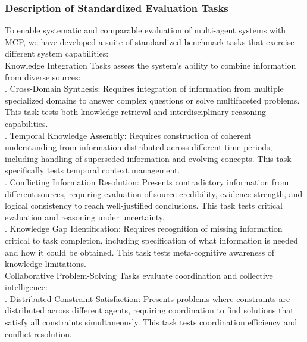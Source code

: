 \subsubsection{Description of Standardized Evaluation Tasks}
To enable systematic and comparable evaluation of multi-agent systems with MCP, we have developed a suite of standardized benchmark tasks that exercise different system capabilities:\\ \newline
Knowledge Integration Tasks assess the system's ability to combine information from diverse sources:\\ . Cross-Domain Synthesis: Requires integration of information from multiple specialized domains to answer complex questions or solve multifaceted problems. This task tests both knowledge retrieval and interdisciplinary reasoning capabilities.\\ . Temporal Knowledge Assembly: Requires construction of coherent understanding from information distributed across different time periods, including handling of superseded information and evolving concepts. This task specifically tests temporal context management.\\ . Conflicting Information Resolution: Presents contradictory information from different sources, requiring evaluation of source credibility, evidence strength, and logical consistency to reach well-justified conclusions. This task tests critical evaluation and reasoning under uncertainty.\\ . Knowledge Gap Identification: Requires recognition of missing information critical to task completion, including specification of what information is needed and how it could be obtained. This task tests meta-cognitive awareness of knowledge limitations.\\ \newline
Collaborative Problem-Solving Tasks evaluate coordination and collective intelligence:\\ . Distributed Constraint Satisfaction: Presents problems where constraints are distributed across different agents, requiring coordination to find solutions that satisfy all constraints simultaneously. This task tests coordination efficiency and conflict resolution.\\ \newline
